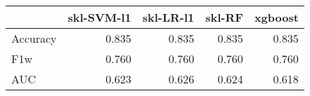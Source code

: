 \begin{tabular}{lrrrr}
\toprule
{} &  skl-SVM-l1 &  skl-LR-l1 &  skl-RF &  xgboost \\
\midrule
Accuracy &       0.835 &      0.835 &   0.835 &    0.835 \\
F1w      &       0.760 &      0.760 &   0.760 &    0.760 \\
AUC      &       0.623 &      0.626 &   0.624 &    0.618 \\
\bottomrule
\end{tabular}
